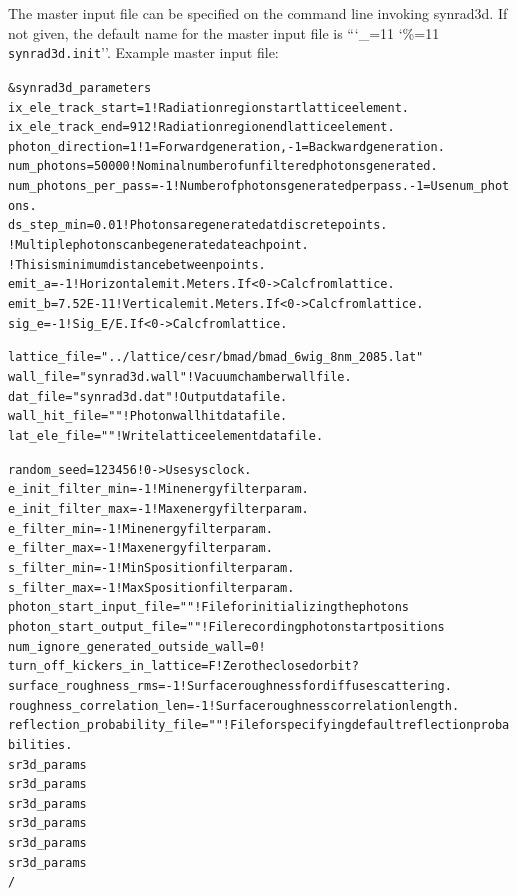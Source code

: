 \documentclass[11pt]{article}
\newcommand\ttcmd{\begingroup\catcode`\_=11 \catcode`\%=11 \dottcmd}
\newcommand\dottcmd[1]{\texttt{#1}\endgroup}
\newcommand{\vn}{\ttcmd}
\newlength{\ExBeg}
\newlength{\ExEnd}
\newenvironment{example}
  {\vspace{\ExBeg} \begin{alltt}}
  {\end{alltt} \vspace{\ExEnd}}
\begin{document}
The master input file can be specified on the command line invoking synrad3d.
If not given, the default name for the master input file is ``\vn{synrad3d.init}''.
Example master input file:
\begin{example}
  &synrad3d_parameters
    ix_ele_track_start   = 1      ! Radiation region start lattice element.
    ix_ele_track_end     = 912    ! Radiation region end lattice element.
    photon_direction     = 1      ! 1 = Forward generation, -1 = Backward generation.
    num_photons          = 50000  ! Nominal number of unfiltered photons generated. 
    num_photons_per_pass = -1     ! Number of photons generated per pass. -1 = Use num_photons.
    ds_step_min      = 0.01   ! Photons are generated at discrete points. 
                              ! Multiple photons can be generated at each point.
                              ! This is minimum distance between points.
    emit_a       = -1         ! Horizontal emit. Meters. If < 0 -> Calc from lattice.
    emit_b       = 7.52E-11   ! Vertical emit.  Meters. If < 0 -> Calc from lattice.
    sig_e        = -1         ! Sig_E/E. If < 0 -> Calc from lattice.

    lattice_file = "../lattice/cesr/bmad/bmad_6wig_8nm_2085.lat" 
    wall_file    = "synrad3d.wall"   ! Vacuum chamber wall file.
    dat_file     = "synrad3d.dat"    ! Output data file.
    wall_hit_file = ""               ! Photon wall hit data file.
    lat_ele_file  = ""               ! Write lattice element data file.

    random_seed = 123456             ! 0 -> Use sys clock.
    e_init_filter_min = -1           ! Min energy filter param.
    e_init_filter_max = -1           ! Max energy filter param.
    e_filter_min = -1                ! Min energy filter param.
    e_filter_max = -1                ! Max energy filter param.
    s_filter_min = -1                ! Min S position filter param.
    s_filter_max = -1                ! Max S position filter param.
    photon_start_input_file  = ""    ! File for initializing the photons
    photon_start_output_file = ""    ! File recording photon start positions
    num_ignore_generated_outside_wall = 0  !
    turn_off_kickers_in_lattice = F        ! Zero the closed orbit?
    surface_roughness_rms = -1             ! Surface roughness for diffuse scattering.
    roughness_correlation_len = -1         ! Surface roughness correlation length.
    reflection_probability_file = ""       ! File for specifying default reflection probabilities.
    sr3d_params%
    sr3d_params%
    sr3d_params%
    sr3d_params%
    sr3d_params%
    sr3d_params%
  /
\end{example}
\end{document}
